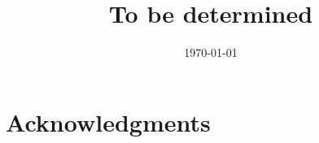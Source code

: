 \documentclass[a4paper,10pt,oneside, fleqn]{article}
\title{To be determined}
\date{\today}
\begin{document}
\maketitle

\pagestyle{fancy}               	%

\vspace*{\fill}
\begin{abstract}

\end{abstract}
\vspace*{\fill}
\newpage

\tableofcontents
\newpage






\section{Acknowledgments}


\newpage 

\appendix
\section{} 

\newpage


\end{document}
